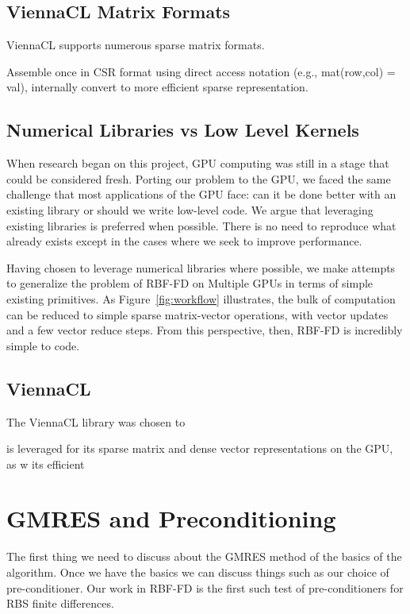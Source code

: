 \documentclass{report}
\begin{document}
\section{ViennaCL Matrix Formats}

ViennaCL supports numerous sparse matrix formats. 

Assemble once in CSR format using direct access notation (e.g., mat(row,col) = val), internally convert to more efficient sparse representation. 



\section{Numerical Libraries vs Low Level Kernels}

When research began on this project, GPU computing was still in a stage that could be considered fresh. Porting our problem to the GPU, we faced the same challenge that most applications of the GPU face: can it be done better with an existing library or should we write low-level code. We argue that leveraging existing libraries is preferred when possible. There is no need to reproduce what already exists except in the cases where we seek to improve performance. 

Having chosen to leverage numerical libraries where possible, we make attempts to generalize the problem of RBF-FD on Multiple GPUs in terms of simple existing primitives. As Figure~\ref{fig:workflow} illustrates, the bulk of computation can be reduced to simple sparse matrix-vector operations, with vector updates and a few vector reduce steps. From this perspective, then, RBF-FD is incredibly simple to code. 

\section{ViennaCL}

The ViennaCL library was chosen to 

is leveraged for its sparse matrix and dense vector representations on the GPU, as w its efficient 




\chapter{GMRES and Preconditioning}
The first thing we need to discuss about the GMRES method of the basics of the algorithm. Once we have the basics we can discuss things such as our choice of pre-conditioner. Our work in RBF-FD is the first such test of pre-conditioners for RBS finite differences.
\end{document}
